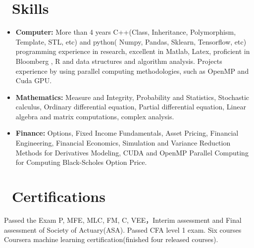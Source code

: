\documentclass{resume}
\begin{document}
\section{\faWrench
\ Skills}
\begin{itemize}[parsep=0.5ex]\large
  \item \textbf{Computer:} More than 4 years C++(Class,  Inheritance,  Polymorphism,  Template,  STL,  etc) and python( Numpy,  Pandas, 
  Sklearn,  Tensorflow,  etc) programming experience in research,   excellent in Matlab,  Latex,  proficient in Bloomberg , R and data structures and algorithm analysis. Projects experience by using parallel computing methodologies,  such as OpenMP and Cuda GPU.
  
  \item \textbf{Mathematics:}
   Measure and Integrity,  Probability and Statistics,  Stochastic calculus, Ordinary differential equation,
  Partial differential equation,  Linear algebra and matrix computations,  complex analysis.
  
  \item \textbf{Finance:} Options,  Fixed Income Fundamentals,  Asset Pricing,  Financial Engineering, Financial Economics, 
  Simulation and Variance Reduction Methods for Derivatives Modeling,   CUDA and OpenMP Parallel Computing for Computing Black-Scholes Option Price.
  
\end{itemize}

\section{\faBook\ Certifications}\large 
Passed the Exam P,  MFE,  MLC,  FM,  C,  VEE，Interim assessment and Final assessment of Society of Actuary(ASA). Passed CFA level 1 exam. Six courses Coursera machine learning certification(finished four released courses).

%
%
\end{document}
